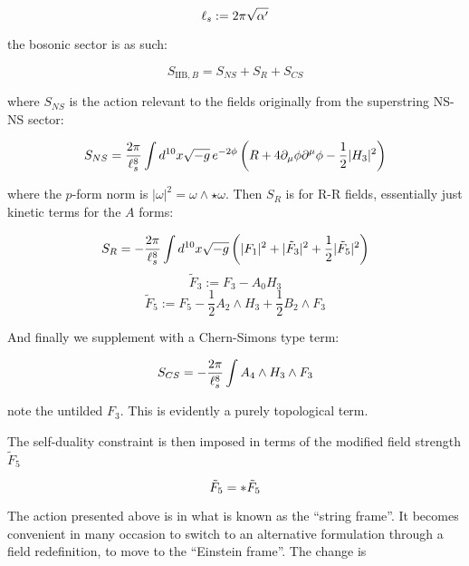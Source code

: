 \begin{equation}
	\ell_s := 2\pi \sqrt{\alpha'}
	\label{}
\end{equation}

the bosonic sector is as such:

\begin{equation} S_{\text{IIB},B} = S_{NS} + S_R + S_{CS} \end{equation}

where $S_{NS}$ is the action relevant to the fields originally from the superstring NS-NS sector:

\begin{equation}
S_{NS} = \frac{2\pi}{\ell_s^8} \int d^{10} x \sqrt{-g} \, e^{-2\phi} \left( R + 4 \partial_\mu \phi \partial^\mu \phi - \frac{1}{2} | H_3 |^2 \right) 
\end{equation}

where the $p$-form norm is $|\omega|^2 = \omega \wedge \star \omega$. Then $S_R$ is for R-R fields, essentially just kinetic terms for the $A$ forms:

\begin{equation}
	S_R = -\frac{2\pi}{\ell_s^8} \int d^{10} x \sqrt{-g} 
\left(| F_1 |^2 + | \tilde{F}_3 |^2 + \frac{1}{2}| \tilde{F}_5 |^2 \right)
\end{equation}
\begin{equation}
	\tilde{F}_3 := F_3 - A_0 H_3
\end{equation}
\begin{equation}
	\tilde{F}_5 := F_5 - \frac{1}{2} A_2 \wedge H_3 + \frac{1}{2} B_2 \wedge F_3
\end{equation}

And finally we supplement with a Chern-Simons type term:

\begin{equation}
S_{CS} = -\frac{2\pi}{\ell_s^8} \int A_4 \wedge H_3 \wedge F_3 
\end{equation}

note the untilded $F_3$. This is evidently a purely topological term.

The self-duality constraint is then imposed in terms of the modified field strength $\tilde F_5$

\begin{equation}
	\tilde F_5 = \ast \tilde F_5
	\label{}
\end{equation}

The action presented above is in what is known as the ``string frame''. It becomes convenient in many occasion to switch to an alternative formulation through a field redefinition, to move to the ``Einstein frame''. The change is

